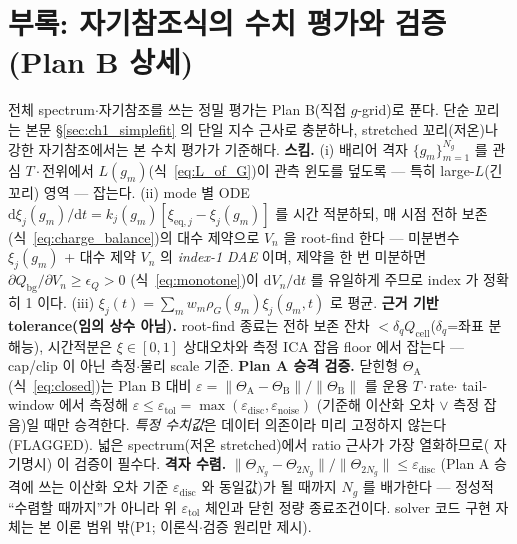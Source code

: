\documentclass[11pt,a4paper]{article}
\newcommand{\dd}{\mathrm{d}}
\newcommand{\eq}{\mathrm{eq}}
\newcommand{\bg}{\mathrm{bg}}
\newcommand{\cell}{\mathrm{cell}}
\begin{document}
\section{부록: 자기참조식의 수치 평가와 검증 (Plan B 상세)}\label{sec:ch1_numeric}
전체 spectrum$\cdot$자기참조를 쓰는 정밀 평가는 Plan B(직접 $g$-grid)로 푼다. 단순 꼬리는 본문
\S\ref{sec:ch1_simplefit} 의 단일 지수 근사로 충분하나, stretched 꼬리(저온)나 강한 자기참조에서는 본 수치
평가가 기준해다.
\textbf{스킴.} (i) 배리어 격자 $\{g_m\}_{m=1}^{N_g}$ 를 관심 $T\cdot$전위에서 $L(g_m)$(식~\eqref{eq:L_of_G})이
관측 윈도를 덮도록 — 특히 large-$L$(긴 꼬리) 영역 — 잡는다. (ii) mode 별 ODE
$\dd\xi_j(g_m)/\dd t=k_j(g_m)[\xi_{\eq,j}-\xi_j(g_m)]$ 를 시간 적분하되, 매 시점 전하 보존
(식~\eqref{eq:charge_balance})의 대수 제약으로 $V_n$ 을 root-find 한다 — 미분변수 $\xi_j(g_m)$ + 대수 제약
$V_n$ 의 \emph{index-1 DAE} 이며, 제약을 한 번 미분하면 $\partial Q_\bg/\partial V_n\ge\epsilon_Q>0$
(식~\eqref{eq:monotone})이 $\dd V_n/\dd t$ 를 유일하게 주므로 index 가 정확히 1 이다. (iii)
$\xi_j(t)=\sum_m w_m\rho_G(g_m)\xi_j(g_m,t)$ 로 평균.
\textbf{근거 기반 tolerance(임의 상수 아님).} root-find 종료는 전하 보존 잔차 $<\delta_q Q_\cell$($\delta_q$=좌표
분해능), 시간적분은 $\xi\in[0,1]$ 상대오차와 측정 ICA 잡음 floor 에서 잡는다 — cap/clip 이 아닌 측정$\cdot$물리
scale 기준.
\textbf{Plan A 승격 검증.} 닫힌형 $\Theta_\mathrm A$(식~\eqref{eq:closed})는 Plan B 대비
$\varepsilon=\lVert\Theta_\mathrm A-\Theta_\mathrm B\rVert/\lVert\Theta_\mathrm B\rVert$ 를 운용 $T\cdot$rate$\cdot$
tail-window 에서 측정해 $\varepsilon\le\varepsilon_{\mathrm{tol}}=\max(\varepsilon_{\mathrm{disc}},\varepsilon_{\mathrm{noise}})$
(기준해 이산화 오차 $\vee$ 측정 잡음)일 때만 승격한다. \emph{특정 수치값}은 데이터 의존이라 미리 고정하지 않는다(FLAGGED). 넓은
spectrum(저온 stretched)에서 ratio 근사가 가장 열화하므로(\cite{jcp2017} 자기명시) 이 검증이 필수다.
\textbf{격자 수렴.} $\lVert\Theta_{N_g}-\Theta_{2N_g}\rVert/\lVert\Theta_{2N_g}\rVert\le\varepsilon_{\mathrm{disc}}$
(Plan A 승격에 쓰는 이산화 오차 기준 $\varepsilon_{\mathrm{disc}}$ 와 동일값)가 될 때까지 $N_g$ 를 배가한다 —
정성적 ``수렴할 때까지''가 아니라 위 $\varepsilon_{\mathrm{tol}}$ 체인과 닫힌 정량 종료조건이다. solver 코드 구현
자체는 본 이론 범위 밖(P1; 이론식$\cdot$검증 원리만 제시).

\end{document}
